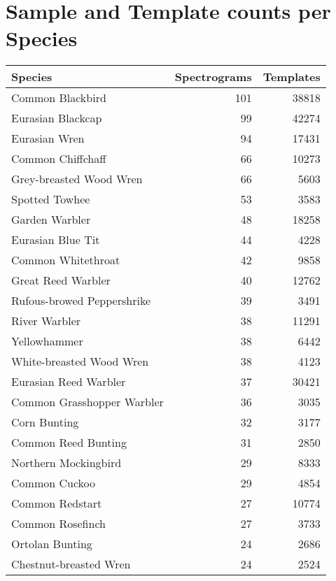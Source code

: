\chapter{Sample and Template counts per Species} \label{app:samples}

  \begin{longtable}{l r r}
Species                         &Spectrograms &Templates \\ \hline
Common Blackbird                &101  &38818 \\
Eurasian Blackcap               &99   &42274 \\
Eurasian Wren                   &94   &17431 \\
Common Chiffchaff               &66   &10273 \\
Grey-breasted Wood Wren         &66   &5603  \\
Spotted Towhee                  &53   &3583  \\
Garden Warbler                  &48   &18258 \\
Eurasian Blue Tit               &44   &4228  \\
Common Whitethroat              &42   &9858  \\
Great Reed Warbler              &40   &12762 \\
Rufous-browed Peppershrike      &39   &3491  \\
River Warbler                   &38   &11291 \\
Yellowhammer                    &38   &6442  \\
White-breasted Wood Wren        &38   &4123  \\
Eurasian Reed Warbler           &37   &30421 \\
Common Grasshopper Warbler      &36   &3035  \\
Corn Bunting                    &32   &3177  \\
Common Reed Bunting             &31   &2850  \\
Northern Mockingbird            &29   &8333  \\
Common Cuckoo                   &29   &4854  \\
Common Redstart                 &27   &10774 \\
Common Rosefinch                &27   &3733  \\
Ortolan Bunting                 &24   &2686  \\
Chestnut-breasted Wren          &24   &2524  \\

\end{longtable}
